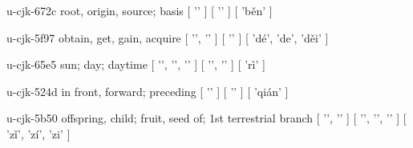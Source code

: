 \begin{multicols}{2}
\lettrine[lines=3]{\cjkgGlue{}}{}\begin{minipage}{0.8\linewidth} u-cjk-672c  root, origin, source; basis  [ '\cjkgGlue{}' ]  [ '\cjkgGlue{}' ]  [ 'běn' ] \end{minipage}

\lettrine[lines=3]{\cjkgGlue{}}{}\begin{minipage}{0.8\linewidth} u-cjk-5f97  obtain, get, gain, acquire  [ '\cjkgGlue{}', '\cjkgGlue{}' ]  [ '\cjkgGlue{}' ]  [ 'dé', 'de', 'děi' ] \end{minipage}

\lettrine[lines=3]{\cjkgGlue{}}{}\begin{minipage}{0.8\linewidth} u-cjk-65e5  sun; day; daytime  [ '\cjkgGlue{}', '\cjkgGlue{}', '\cjkgGlue{}' ]  [ '\cjkgGlue{}', '\cjkgGlue{}' ]  [ 'rì' ] \end{minipage}

\lettrine[lines=3]{\cjkgGlue{}}{}\begin{minipage}{0.8\linewidth} u-cjk-524d  in front, forward; preceding  [ '\cjkgGlue{}' ]  [ '\cjkgGlue{}' ]  [ 'qián' ] \end{minipage}

\lettrine[lines=3]{\cjkgGlue{}}{}\begin{minipage}{0.8\linewidth} u-cjk-5b50  offspring, child; fruit, seed of; 1st terrestrial branch  [ '\cjkgGlue{}', '\cjkgGlue{}' ]  [ '\cjkgGlue{}', '\cjkgGlue{}', '\cjkgGlue{}' ]  [ 'zǐ', 'zí', 'zi' ] \end{minipage}


\end{multicols}
